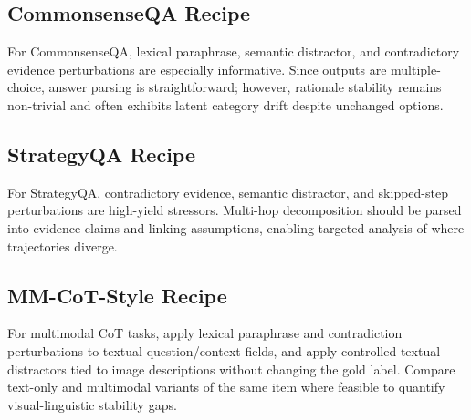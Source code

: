 \documentclass[conference]{IEEEtran}
\begin{document}
\subsection{CommonsenseQA Recipe}
For CommonsenseQA, lexical paraphrase, semantic distractor, and contradictory evidence perturbations are especially informative. Since outputs are multiple-choice, answer parsing is straightforward; however, rationale stability remains non-trivial and often exhibits latent category drift despite unchanged options.

\subsection{StrategyQA Recipe}
For StrategyQA, contradictory evidence, semantic distractor, and skipped-step perturbations are high-yield stressors. Multi-hop decomposition should be parsed into evidence claims and linking assumptions, enabling targeted analysis of where trajectories diverge.

\subsection{MM-CoT-Style Recipe}
For multimodal CoT tasks, apply lexical paraphrase and contradiction perturbations to textual question/context fields, and apply controlled textual distractors tied to image descriptions without changing the gold label. Compare text-only and multimodal variants of the same item where feasible to quantify visual-linguistic stability gaps.
\end{document}
